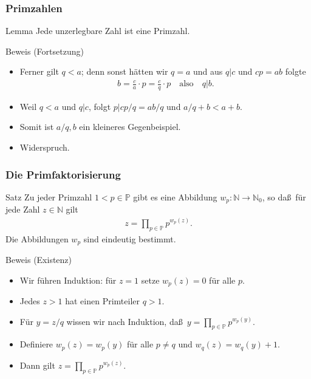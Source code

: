 \documentclass{beamer}
\newcommand\NN{\mathbb N}
\newcommand\PP{\mathbb P}
\renewcommand{\ae}{\"a}
\newcommand{\ue}{\"u}
\begin{document}
\begin{frame}\frametitle{Primzahlen}
	\begin{block}{Lemma}
		Jede unzerlegbare Zahl ist eine Primzahl.
	\end{block}
	\begin{block}{Beweis (Fortsetzung)}
		\begin{itemize}
			\item Ferner gilt $q<a$; denn sonst h\ae tten wir $q=a$ und aus $q|c$ und $cp=ab$ folgte
\begin{align*}
	b=\frac{c}{a}\cdot p=\frac{c}{q}\cdot p\quad\mbox{also}\quad q|b.
\end{align*}
			\item Weil $q<a$ und $q|c$, folgt $p|cp/q=ab/q$ und $a/q+b<a+b$.
			\item Somit ist $a/q,b$ ein kleineres Gegenbeispiel.
			\item Widerspruch.
		\end{itemize}
	\end{block}

\end{frame}

\begin{frame}\frametitle{Die Primfaktorisierung}
	\begin{block}{Satz}
		Zu jeder Primzahl $1<p\in\PP$ gibt es eine Abbildung $w_p:\NN\to\NN_0$, so da\ss\ f\ue r jede Zahl $z\in\NN$ gilt
		\begin{align*}
			z=\prod_{p\in\PP}p^{w_p(z)}.
		\end{align*}
		Die Abbildungen $w_p$ sind eindeutig bestimmt.
	\end{block}
	\begin{block}{Beweis (Existenz)}
		\begin{itemize}
			\item Wir f\ue hren Induktion: f\ue r $z=1$ setze $w_p(z)=0$ f\ue r alle $p$.
			\item Jedes $z>1$ hat einen Primteiler $q>1$.
			\item F\ue r $y=z/q$ wissen wir nach Induktion, da\ss\ $ y=\prod_{p\in\PP}p^{w_p(y)}.  $
			\item Definiere $w_p(z)=w_p(y)$ f\ue r alle $p\neq q$ und $w_q(z)=w_q(y)+1$.
			\item Dann gilt $z=\prod_{p\in\PP}p^{w_p(z)}.$
		\end{itemize}
	\end{block}
\end{frame}
\end{document}
